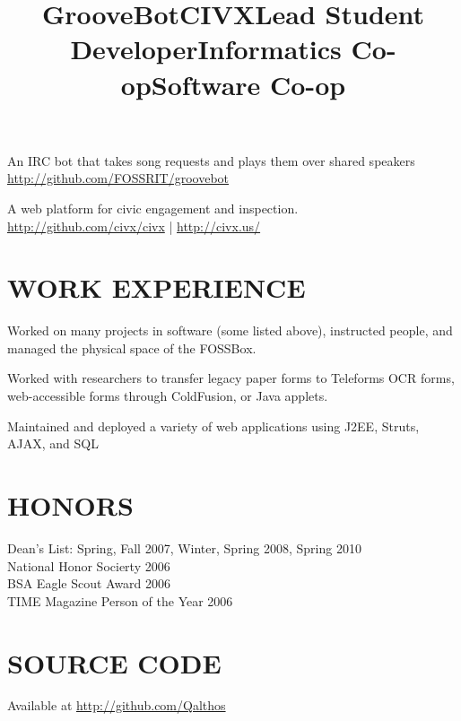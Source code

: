 \documentclass[line]{res}
\begin{document}
\begin{resume}
    \title{GrooveBot}
    \begin{position}
        An IRC bot that takes song requests and plays them over shared speakers\\
        \url{http://github.com/FOSSRIT/groovebot}
    \end{position}
    \title{CIVX}
    \begin{position}
        A web platform for civic engagement and inspection.\\
        \url{http://github.com/civx/civx} | \url{http://civx.us/}
    \end{position}

\section{WORK EXPERIENCE}
    \title{Lead Student Developer}
    \begin{position}
        Worked on many projects in software (some listed above), instructed
        people, and managed the physical space of the FOSSBox.
    \end{position}

    \title{Informatics Co-op}
    \begin{position}
        Worked with researchers to transfer legacy paper forms to Teleforms OCR
        forms, web-accessible forms through ColdFusion, or Java applets.
    \end{position}

    \title{Software Co-op}
    \begin{position}
        Maintained and deployed a variety of web applications using J2EE,
        Struts, AJAX, and SQL
    \end{position}

\section{HONORS}
    Dean's List: Spring, Fall 2007, Winter, Spring 2008, Spring 2010 \\
    National Honor Socierty 2006 \\
    BSA Eagle Scout Award 2006 \\
    TIME Magazine Person of the Year 2006 \\

\section{SOURCE CODE}
    Available at \url{http://github.com/Qalthos}\\

\end{resume}
\end{document}
